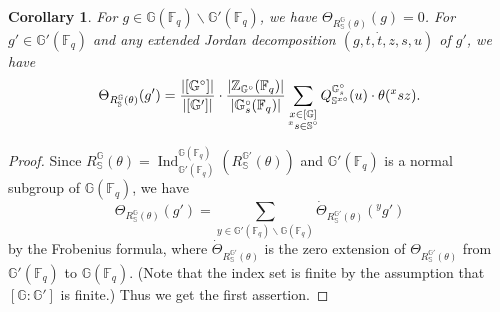 \documentclass{amsart}
\newcommand{\F}{\mathbb{F}}
\newcommand{\bbS}{\mathbb{S}}
\newcommand{\bbG}{\mathbb{G}}
\newcommand{\bbZ}{\mathbb{Z}}
\DeclareMathOperator{\Ind}{Ind}
\theoremstyle{plain}
\newtheorem{cor}[thm]{Corollary}
\theoremstyle{definition}
\theoremstyle{remark}
\theoremstyle{theorem}
\begin{document}
\begin{cor}\label{cor:Kaletha-CF}
For $g\in\bbG(\F_{q})\smallsetminus\bbG'(\F_{q})$, we have $\Theta_{R_{\bbS}^{\bbG}(\theta)}(g)=0$.
For $g'\in\bbG'(\F_{q})$ and any extended Jordan decomposition $(g,t,\dot{t},z,s,u)$ of $g'$, we have
\[
\Theta_{R_{\bbS}^{\bbG}(\theta)}(g')
=
\frac{|[\bbG^{\circ}]|}{|[\bbG']|}
\cdot\frac{|\bbZ_{\bbG^{\circ}}(\F_{q})|}{|\bbG^{\circ}_{s}(\F_{q})|}
\sum_{\begin{subarray}{c}x\in [\bbG] \\ {}^{x}s\in\bbS^{\circ}\end{subarray}}
Q^{\bbG^{\circ}_{s}}_{\bbS^{x\circ}}(u)\cdot \theta({}^{x}sz).
\]
\end{cor}

\begin{proof}
Since $R_{\bbS}^{\bbG}(\theta)=\Ind_{\bbG'(\F_{q})}^{\bbG(\F_{q})}(R_{\bbS}^{\bbG'}(\theta))$ and $\bbG'(\F_{q})$ is a normal subgroup of $\bbG(\F_{q})$, we have 
\[
\Theta_{R_{\bbS}^{\bbG}(\theta)}(g')
=
\sum_{y\in \bbG'(\F_{q})\backslash\bbG(\F_{q})}\dot{\Theta}_{R_{\bbS}^{\bbG'}(\theta)}({}^{y}g')
\]
by the Frobenius formula, where $\dot{\Theta}_{R_{\bbS}^{\bbG'}(\theta)}$ is the zero extension of $\Theta_{R_{\bbS}^{\bbG'}(\theta)}$ from $\bbG'(\F_{q})$ to $\bbG(\F_{q})$.
(Note that the index set is finite by the assumption that $[\bbG:\bbG']$ is finite.)
Thus we get the first assertion.


\end{proof}
\end{document}
